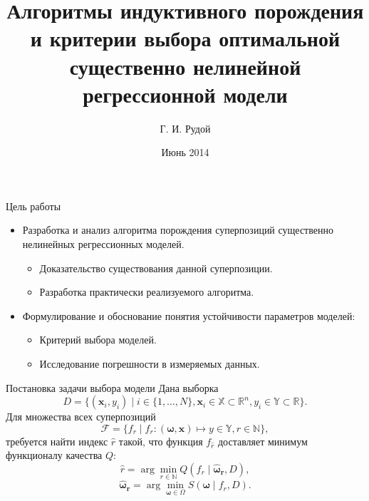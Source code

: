 \documentclass{beamer}
\begin{document}
\title[Порождение и выбор моделей\hspace{4em}\insertframenumber/\inserttotalframenumber]{Алгоритмы индуктивного порождения и критерии выбора оптимальной существенно нелинейной регрессионной модели}
\author{Г. И. Рудой}
\date{Июнь 2014}

\begin{frame}
  \maketitle
\end{frame}

\begin{frame}{Цель работы}
  \begin{itemize}
  	\item Разработка и анализ алгоритма порождения суперпозиций существенно нелинейных регрессионных моделей.
	  \begin{itemize}
		\item Доказательство существования данной суперпозиции.
		\item Разработка практически реализуемого алгоритма.
	  \end{itemize}
	\item Формулирование и обоснование понятия устойчивости параметров моделей:
	\begin{itemize}
	  \item Критерий выбора моделей.
	  \item Исследование погрешности в измеряемых данных.
	\end{itemize}
  \end{itemize}
\end{frame}

\begin{frame}{Постановка задачи выбора модели}
  Дана выборка
  \[
  D = \{ (\mathbf{x}_i, y_i) \mid i \in \{1, \dots, N\},
			  \mathbf{x}_i \in \mathbb{X} \subset \mathbb{R}^n,
			  y_i \in \mathbb{Y} \subset \mathbb{R} \}.
  \]
  Для множества всех суперпозиций
  \[
  \mathcal{F} = \{ f_r \mid
			  f_r : (\boldsymbol{\omega}, \mathbf{x}) \mapsto y \in \mathbb{Y},
			  r \in \mathbb{N} \},
  \]
  требуется найти индекс $\hat{r}$ такой, что функция $f_{\hat{r}}$ доставляет
  минимум функционалу качества $Q$:
  \[
  \hat{r} = \arg \min_{r \in \mathbb{N}} Q (f_r \mid \boldsymbol{\hat{\omega}_r}, D),
  \]
  \[
  \boldsymbol{\hat{\omega}_r} = \arg \min_{\boldsymbol{\omega} \in \Omega} S(\boldsymbol{\omega} \mid f_r, D).
  \]
\end{frame}
\end{document}
